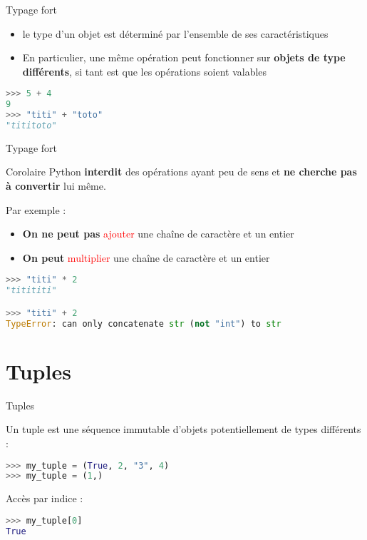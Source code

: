 \begin{frame}[fragile]{Typage fort}
  \medskip
    \begin{itemize}
      \item le type d'un objet est déterminé par l'ensemble de ses caractéristiques %
      \item En particulier, une même opération peut fonctionner sur \textbf{objets de type différents}, si tant est que les opérations soient valables
    \end{itemize}

\begin{lstlisting}[language=Python, morekeywords={as}, numbers=none]
>>> 5 + 4
9
>>> "titi" + "toto"
"tititoto"
\end{lstlisting}

\end{frame}

\begin{frame}[fragile]{Typage fort}
    \begin{block}{Corolaire}
      \medskip
      Python \textbf{interdit} des opérations ayant peu de sens et \textbf{ne cherche pas à convertir} lui même.

      Par exemple :
      \begin{itemize}
        \item \textbf{On ne peut pas} \textcolor{red}{ajouter} une chaîne de caractère et un entier
        \item \textbf{On peut} \textcolor{red}{multiplier} une chaîne de caractère et un entier
      \end{itemize}

    \end{block}

\begin{lstlisting}[language=Python, morekeywords={as, TypeError}, numbers=none]
>>> "titi" * 2
"titititi"

>>> "titi" + 2
TypeError: can only concatenate str (not "int") to str
\end{lstlisting}

\end{frame}

\section{Tuples}

\begin{frame}[fragile]{Tuples}

  Un tuple est une séquence immutable d'objets potentiellement de types différents :
\begin{lstlisting}[language=Python, morekeywords={True, false}, numbers=none]
>>> my_tuple = (True, 2, "3", 4)
>>> my_tuple = (1,)
\end{lstlisting}
  
  Accès par indice :
\begin{lstlisting}[language=Python, morekeywords={True, false}, numbers=none]
>>> my_tuple[0]
True
\end{lstlisting}
\end{frame}

